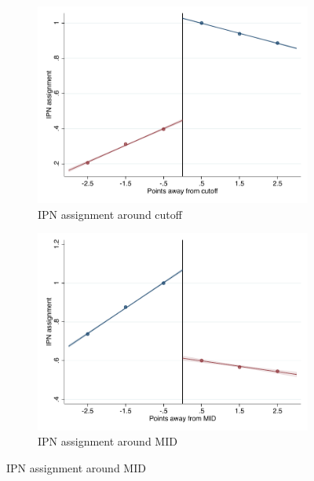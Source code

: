 \documentclass[oneside,11pt]{article}
\begin{document}
\begin{figure}[H]
\begin{center}
    \begin{subfigure}{0.475\textwidth}
        \caption{IPN assignment around cutoff}
        \centering
        \includegraphics[width=\textwidth]{04_Figures/rd_plot_tau_IPN_assig_IPN3.pdf}
    \end{subfigure}
    \begin{subfigure}{0.475\textwidth}
        \caption{IPN assignment around MID}
        \centering
        \includegraphics[width=\textwidth]{04_Figures/rd_plot_mid_IPN_assig_IPN3.pdf}
    \end{subfigure}


\end{center}
\end{figure}
\end{document}
